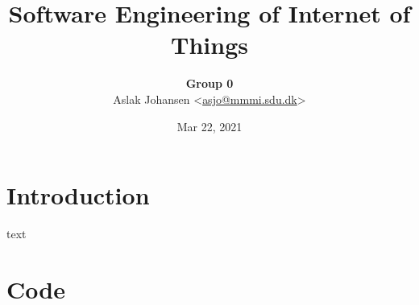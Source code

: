 \documentclass[a4paper]{article}
\begin{document}
\title{Software Engineering of Internet of Things\\\scalebox{.85}{Handin 0: Sampling Rate}}
\author{
    \textbf{Group 0} \\
    Aslak Johansen <\href{mailto:asjo@mmmi.sdu.dk}{asjo@mmmi.sdu.dk}>
}
\date{Mar 22, 2021}
\maketitle
\vspace{5mm}

\section{Introduction}

text

\appendix

\section{Code}
\end{document}
